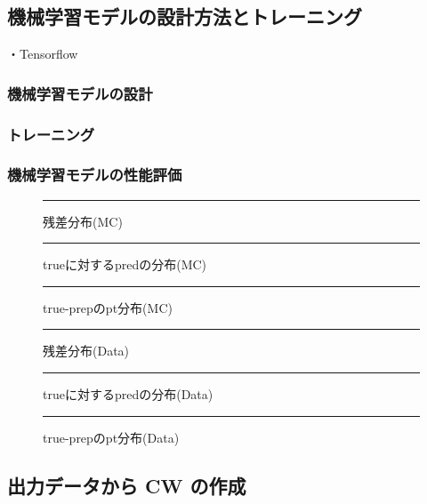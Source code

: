 \subsection{機械学習モデルの設計方法とトレーニング}
・Tensorflow\\
\subsubsection{機械学習モデルの設計}

\subsubsection{トレーニング}

\subsubsection{機械学習モデルの性能評価}
\begin{figure}[tb]
  \centering
  \rule{8cm}{6cm}
  \caption{残差分布(MC)}
  \label{fig:fit_def}
\end{figure}

\begin{figure}[tb]
  \centering
  \rule{8cm}{6cm}
  \caption{trueに対するpredの分布(MC)}
  \label{fig:fit_def}
\end{figure}

\begin{figure}[tb]
  \centering
  \rule{8cm}{6cm}
  \caption{true-prepのpt分布(MC)}
  \label{fig:fit_def}
\end{figure}

\begin{figure}[tb]
  \centering
  \rule{8cm}{6cm}
  \caption{残差分布(Data)}
  \label{fig:fit_def}
\end{figure}

\begin{figure}[tb]
  \centering
  \rule{8cm}{6cm}
  \caption{trueに対するpredの分布(Data)}
  \label{fig:fit_def}
\end{figure}

\begin{figure}[tb]
  \centering
  \rule{8cm}{6cm}
  \caption{true-prepのpt分布(Data)}
  \label{fig:fit_def}
\end{figure}


\subsection{出力データから CW の作成}
